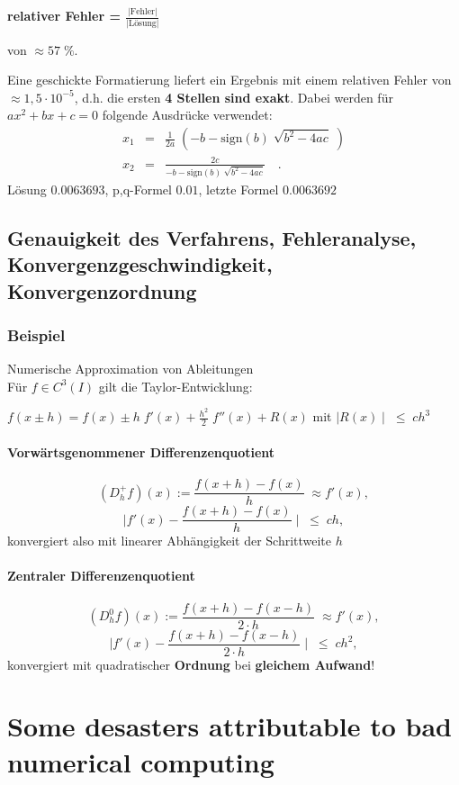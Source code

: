 \documentclass[ngerman,fontsize=11pt, paper=a4, parskip=half, titlepage=true, toc=bib]{scrbook}
\begin{document}
{\bf{relativer} \bf{Fehler} = $\frac{|\mbox{Fehler}|}{|\mbox{Lösung}|}$}

von        $\approx 57 \; \%$.

Eine geschickte Formatierung liefert ein Ergebnis mit einem
relativen Fehler von $\approx 1,5 \cdot 10^{-5}$,
d.h. die ersten \textbf{4 Stellen sind exakt}. 
Dabei werden für $ax^2 + bx + c = 0$ folgende Ausdrücke verwendet:
\begin{align*}
  x_1 &=& \tfrac{1}{2a} \; (- b - \mbox{sign}(b) \; \sqrt{b^2 -
          4ac}\;)\\
  x_2& =  &\tfrac{2c}{- b - \mbox{sign}(b) \; \sqrt{b^2 - 4ac}} \quad .
\end{align*}
Lösung $0.0063693$, p,q-Formel $0.01$,
letzte Formel $0.0063692$

\subsection*{Genauigkeit des Verfahrens, Fehleranalyse,
  Konvergenzgeschwindigkeit, Konvergenzordnung}

\subsubsection{Beispiel}
Numerische Approximation von Ableitungen \\
Für $f \in C^3(I)$ gilt die Taylor-Entwicklung:

$f(x \pm h) = f(x) \pm h \; f'(x) + \frac{h^2}{2} \; f''(x) +
R(x)$ mit $\mid R(x) \mid \; \leq \; c   h^3$

\paragraph{Vorwärtsgenommener Differenzenquotient}
$$ (D_h^+f)(x):= \frac{f(x + h) - f(x)}{h} \; \approx f'(x), $$
$$\mid f'(x) - \frac{f(x + h) - f(x)}{h} \mid \; \leq \; c h, $$
konvergiert also mit linearer Abhängigkeit der
Schrittweite $h$  
\paragraph{Zentraler Differenzenquotient}
$$(D_h^0f) (x):= \frac{f(x + h) - f(x-h)}{2 \cdot h} \; \approx
f'(x),$$
$$\mid f'(x) - \frac{f(x + h) - f(x - h)}{2 \cdot h} \mid \;
\leq \; c h^2, $$
konvergiert mit quadratischer \textbf{Ordnung} bei
\textbf{gleichem Aufwand}!


\section*{Some desasters attributable to bad numerical computing}
\end{document}
